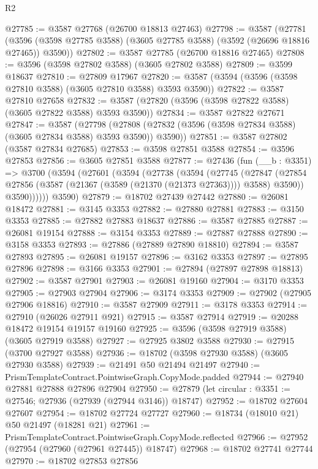 \begin{lexlean}{R2}
\begin{coremodule}
@27785 := @3587 @27768 (@26700 @18813 @27463)
@27798 := @3587
    (@27781 (@3596 (@3598 @27785 @3588) (@3605 @27785 @3588) (@3592 (@26696 @18816 @27465)) @3590))
@27802 := @3587 @27785 (@26700 @18816 @27465)
@27808 := @3596 (@3598 @27802 @3588) (@3605 @27802 @3588)
@27809 := @3599 @18637
@27810 := @27809 @17967
@27820 := @3587 (@3594 (@3596 (@3598 @27810 @3588) (@3605 @27810 @3588) @3593 @3590))
@27822 := @3587 @27810 @27658
@27832 := @3587 (@27820 (@3596 (@3598 @27822 @3588) (@3605 @27822 @3588) @3593 @3590))
@27834 := @3587 @27822 @27671
@27847 := @3587
    (@27798 (@27808 (@27832 (@3596 (@3598 @27834 @3588) (@3605 @27834 @3588) @3593 @3590)) @3590))
@27851 := @3587 @27802 (@3587 @27834 @27685)
@27853 := @3598 @27851 @3588
@27854 := @3596 @27853
@27856 := @3605 @27851 @3588
@27877 := @27436
    (fun (__b : @3351) =>
    @3700
      (@3594
        (@27601
          (@3594
            (@27738
              (@3594
                (@27745
                  (@27847
                    (@27854 @27856 (@3587 (@21367 (@3589 (@21370 (@21373 @27363)))) @3588) @3590))
                  @3590))))))
      @3590)
@27879 := @18702 @27439 @27442
@27880 := @26081 @18472
@27881 := @3145 @3353
@27882 := @27880 @27881
@27883 := @3150 @3353
@27885 := @27882 @27883 @18637
@27886 := @3587 @27885
@27887 := @26081 @19154
@27888 := @3154 @3353
@27889 := @27887 @27888
@27890 := @3158 @3353
@27893 := @27886 (@27889 @27890 @18810)
@27894 := @3587 @27893
@27895 := @26081 @19157
@27896 := @3162 @3353
@27897 := @27895 @27896
@27898 := @3166 @3353
@27901 := @27894 (@27897 @27898 @18813)
@27902 := @3587 @27901
@27903 := @26081 @19160
@27904 := @3170 @3353
@27905 := @27903 @27904
@27906 := @3174 @3353
@27909 := @27902 (@27905 @27906 @18816)
@27910 := @3587 @27909
@27911 := @3178 @3353
@27914 := @27910 (@26026 @27911 @921)
@27915 := @3587 @27914
@27919 := @20288 @18472 @19154 @19157 @19160
@27925 := @3596 (@3598 @27919 @3588) (@3605 @27919 @3588)
@27927 := @27925 @3802 @3588
@27930 := @27915 (@3700 @27927 @3588)
@27936 := @18702 (@3598 @27930 @3588) (@3605 @27930 @3588)
@27939 := @21491 @50 @21494 @21497
@27940 := PrismTemplateContract.PointwiseGraph.CopyMode.padded
@27944 := @27940 @27881 @27888 @27896 @27904
@27950 := @27879 (let circular : @3351 := @27546; @27936 (@27939 (@27944 @3146)) @18747)
@27952 := @18702 @27604 @27607
@27954 := @18702 @27724 @27727
@27960 := @18734 (@18010 @21) @50 @21497 (@18281 @21)
@27961 := PrismTemplateContract.PointwiseGraph.CopyMode.reflected
@27966 := @27952 (@27954 (@27960 (@27961 @27445)) @18747)
@27968 := @18702 @27741 @27744
@27970 := @18702 @27853 @27856

\end{coremodule}
\end{lexlean}
